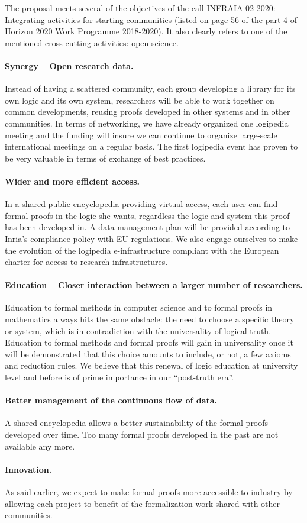 The proposal meets several of the objectives of the call
INFRAIA-02-2020: Integrating activities for starting communities
(listed on page 56 of the part 4 of Horizon 2020 Work Programme
2018-2020). It also clearly refers to one of the mentioned
cross-cutting activities: open science.

\paragraph{Synergy – Open research data.}
Instead of having a scattered community,
each group developing a library for its own logic and its own system,
researchers will be able to work together on common developments,
reusing proofs developed in other systems and in other communities. In
terms of networking, we have already organized one logipedia meeting
and the funding will insure we can continue to organize large-scale
international meetings on a regular basis. The first logipedia event
has proven to be very valuable in terms of exchange of best practices.

\paragraph{Wider and more efficient access.}
In a shared public encyclopedia
providing virtual access, each user can find formal proofs in the
logic she wants, regardless the logic and system this proof has been
developed in. A data management plan will be provided according to
Inria’s compliance policy with EU regulations. We also engage
ourselves to make the evolution of the logipedia e-infrastructure
compliant with the European charter for access to research
infrastructures.


\paragraph{Education – Closer interaction between a larger number of
researchers.}
Education to formal methods in computer science and to
formal proofs in mathematics always hits the same obstacle: the need
to choose a specific theory or system, which is in contradiction with
the universality of logical truth. Education to formal methods and
formal proofs will gain in universality once it will be demonstrated
that this choice amounts to include, or not, a few axioms and
reduction rules. We believe that this renewal of logic education at
university level and before is of prime importance in our “post-truth
era”.


\paragraph{Better management of the continuous flow of data.}
A shared
encyclopedia allows a better sustainability of the formal proofs
developed over time. Too many formal proofs developed in the past are
not available any more.


\paragraph{Innovation.}
As said earlier, we expect to make formal proofs more
accessible to industry by allowing each project to benefit of the
formalization work shared with other communities.
